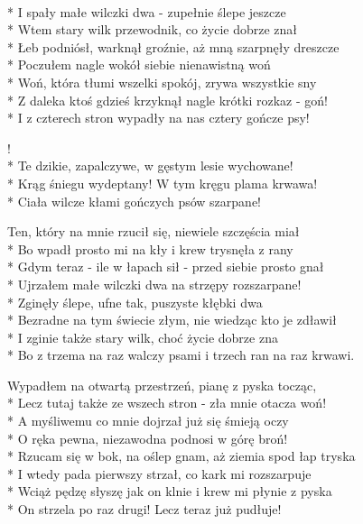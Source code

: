 \begin{lyrics}[longestline={Bo z trzema na raz walczy psami i trzech ran na raz krwawi.}]

\\*
I spały małe wilczki dwa - zupełnie ślepe jeszcze\\*
Wtem stary wilk przewodnik, co życie dobrze znał\\*
Łeb podniósł, warknął groźnie, aż mną szarpnęły dreszcze\\*
Poczułem nagle wokół siebie nienawistną woń\\*
Woń, która tłumi wszelki spokój, zrywa wszystkie sny\\*
Z daleka ktoś gdzieś krzyknął nagle krótki rozkaz - goń!\\*
I z czterech stron wypadły na nas cztery gończe psy!

\begin{chorus}
!\\*
Te dzikie, zapalczywe, w gęstym lesie wychowane!\\*
Krąg śniegu wydeptany! W tym kręgu plama krwawa!\\*
Ciała wilcze kłami gończych psów szarpane!
\end{chorus}

Ten, który na mnie rzucił się, niewiele szczęścia miał\\*
Bo wpadł prosto mi na kły i krew trysnęła z rany\\*
Gdym teraz - ile w łapach sił - przed siebie prosto gnał\\*
Ujrzałem małe wilczki dwa na strzępy rozszarpane!\\*
Zginęły ślepe, ufne tak, puszyste kłębki dwa\\*
Bezradne na tym świecie złym, nie wiedząc kto je zdławił\\*
I zginie także stary wilk, choć życie dobrze zna\\*
Bo z trzema na raz walczy psami i trzech ran na raz krwawi.

\chorusref

Wypadłem na otwartą przestrzeń, pianę z pyska tocząc,\\*
Lecz tutaj także ze wszech stron - zła mnie otacza woń!\\*
A myśliwemu co mnie dojrzał już się śmieją oczy\\*
O ręka pewna, niezawodna podnosi w górę broń!\\*
Rzucam się w bok, na oślep gnam, aż ziemia spod łap tryska\\*
I wtedy pada pierwszy strzał, co kark mi rozszarpuje\\*
Wciąż pędzę słyszę jak on klnie i krew mi płynie z pyska\\*
On strzela po raz drugi! Lecz teraz już pudłuje!


\end{lyrics}
